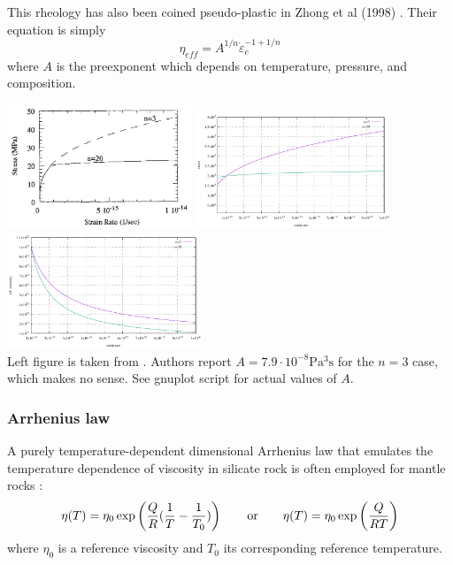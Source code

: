 This rheology has also been coined pseudo-plastic in Zhong et al (1998) \cite{zhgm98}. 
Their equation is simply  
\[
\eta_{eff} = A^{1/n} \dot{\varepsilon}_e^{-1+1/n}
\]
where $A$ is the preexponent which depends on temperature, pressure, and composition.
\begin{center}
\includegraphics[width=5.5cm]{images/rheology/zhgm98}
\includegraphics[width=5.8cm]{images/rheology/pseudoplastic/stress}
\includegraphics[width=5.8cm]{images/rheology/pseudoplastic/eta_eff}\\
{\captionfont Left figure is taken from \cite{zhgm98}. Authors report $A=7.9\cdot 10^{-8} \si{\pascal^3\second}$ 
for the $n=3$ case, which makes no sense. See gnuplot script for actual values of $A$.}
\end{center}




\subsubsection{Arrhenius law}

A purely temperature-dependent dimensional Arrhenius law that emulates the temperature
dependence of viscosity in silicate rock is often employed for mantle rocks 
\cite{albe00,zhzm09,vata11,bogs13b,namu13,stha13,boba19,gult19}:
\begin{equation}
\eta(T)=\eta_0 \exp \left( \frac{Q}{R}(\frac{1}{T}-\frac{1}{T_0}) \right)
\qquad 
{\rm or}
\qquad 
\eta(T)=\eta_0 \exp \left( \frac{Q}{RT} \right)
\end{equation}
where $\eta_0$ is a reference viscosity and $T_0$ its corresponding reference 
temperature.

